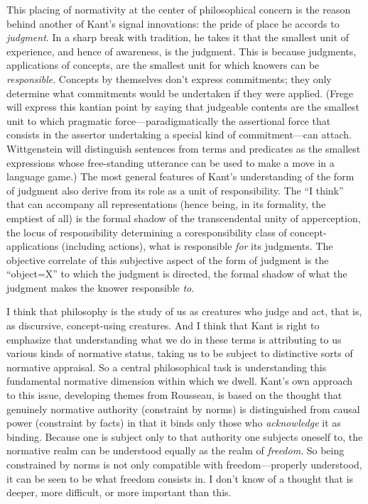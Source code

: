 This placing of normativity at the center of philosophical concern is
the reason behind another of Kant's signal innovations: the pride of
place he accords to \emph{judgment}. In a sharp break with tradition, he
takes it that the smallest unit of experience, and hence of awareness,
is the judgment. This is because judgments, applications of concepts,
are the smallest unit for which knowers can be \emph{responsible}.
Concepts by themselves don't express commitments; they only determine
what commitments would be undertaken if they were applied. (Frege will
express this kantian point by saying that judgeable contents are the
smallest unit to which pragmatic force---paradigmatically the
assertional force that consists in the assertor undertaking a special
kind of commitment---can attach. Wittgenstein will distinguish sentences
from terms and predicates as the smallest expressions whose
free-standing utterance can be used to make a move in a language game.)
The most general features of Kant's understanding of the form of
judgment also derive from its role as a unit of responsibility. The ``I
think'' that can accompany all representations (hence being, in its
formality, the emptiest of all) is the formal shadow of the
transcendental unity of apperception, the locus of responsibility
determining a coresponsibility class of concept-applications (including
actions), what is responsible \emph{for} its judgments. The objective
correlate of this subjective aspect of the form of judgment is the
``object=X'' to which the judgment is directed, the formal shadow of
what the judgment makes the knower responsible \emph{to}.

I think that philosophy is the study of us as creatures who judge and
act, that is, as discursive, concept-using creatures. And I think that
Kant is right to emphasize that understanding what we do in these terms
is attributing to us various kinds of normative status, taking us to be
subject to distinctive sorts of normative appraisal. So a central
philosophical task is understanding this fundamental normative dimension
within which we dwell. Kant's own approach to this issue, developing
themes from Rousseau, is based on the thought that genuinely normative
authority (constraint by norms) is distinguished from causal power
(constraint by facts) in that it binds only those who \emph{acknowledge}
it as binding. Because one is subject only to that authority one
subjects oneself to, the normative realm can be understood equally as
the realm of \emph{freedom}. So being constrained by norms is not only
compatible with freedom---properly understood, it can be seen to be what
freedom consists in. I don't know of a thought that is deeper, more
difficult, or more important than this.

